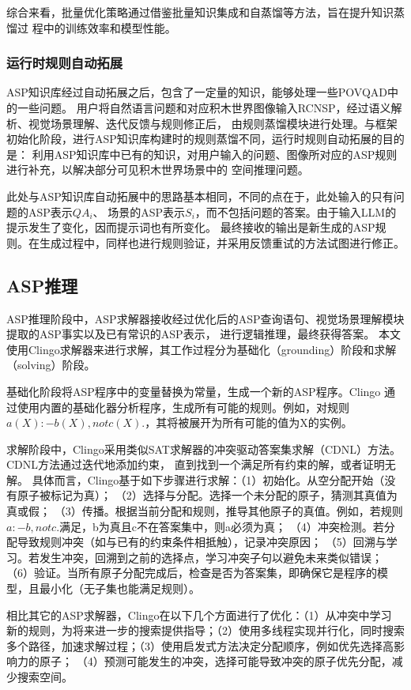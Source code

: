 综合来看，批量优化策略通过借鉴批量知识集成和自蒸馏等方法，旨在提升知识蒸馏过
程中的训练效率和模型性能。

\subsubsection{运行时规则自动拓展}
ASP知识库经过自动拓展之后，包含了一定量的知识，能够处理一些POVQAD中的一些问题。
用户将自然语言问题和对应积木世界图像输入RCNSP，经过语义解析、视觉场景理解、迭代反馈与规则修正后，
由规则蒸馏模块进行处理。与框架初始化阶段，进行ASP知识库构建时的规则蒸馏不同，运行时规则自动拓展的目的是：
利用ASP知识库中已有的知识，对用户输入的问题、图像所对应的ASP规则进行补充，以解决部分可见积木世界场景中的
空间推理问题。

此处与ASP知识库自动拓展中的思路基本相同，不同的点在于，此处输入的只有问题的ASP表示$QA_i$、
场景的ASP表示$S_i$，而不包括问题的答案。由于输入LLM的提示发生了变化，因而提示词也有所变化。
最终接收的输出是新生成的ASP规则。在生成过程中，同样也进行规则验证，并采用反馈重试的方法试图进行修正。
\subsection{ASP推理}
ASP推理阶段中，ASP求解器接收经过优化后的ASP查询语句、视觉场景理解模块提取的ASP事实以及已有常识的ASP表示，
进行逻辑推理，最终获得答案。
本文使用Clingo求解器来进行求解，其工作过程分为基础化（grounding）阶段和求解（solving）阶段。

基础化阶段将ASP程序中的变量替换为常量，生成一个新的ASP程序。Clingo
通过使用内置的基础化器分析程序，生成所有可能的规则。例如，对规则
$a(X) :- b(X), not c(X).$，其将被展开为所有可能的值为X的实例。

求解阶段中，Clingo采用类似SAT求解器的冲突驱动答案集求解（CDNL）方法。CDNL方法通过迭代地添加约束，
直到找到一个满足所有约束的解，或者证明无解。
具体而言，Clingo基于如下步骤进行求解：（1）初始化。从空分配开始（没有原子被标记为真）；
（2）选择与分配。选择一个未分配的原子，猜测其真值为真或假；
（3）传播。根据当前分配和规则，推导其他原子的真值。例如，若规则$a :- b, not c.$满足，b为真且c不在答案集中，则a必须为真；
（4）冲突检测。若分配导致规则冲突（如与已有的约束条件相抵触），记录冲突原因；
（5）回溯与学习。若发生冲突，回溯到之前的选择点，学习冲突子句以避免未来类似错误；
（6）验证。当所有原子分配完成后，检查是否为答案集，即确保它是程序的模型，且最小化（无子集也能满足规则）。

相比其它的ASP求解器，Clingo在以下几个方面进行了优化：（1）从冲突中学习
新的规则，为将来进一步的搜索提供指导；（2）使用多线程实现并行化，同时搜索
多个路径，加速求解过程；（3）使用启发式方法决定分配顺序，例如优先选择高影响力的原子；
（4）预测可能发生的冲突，选择可能导致冲突的原子优先分配，减少搜索空间。
